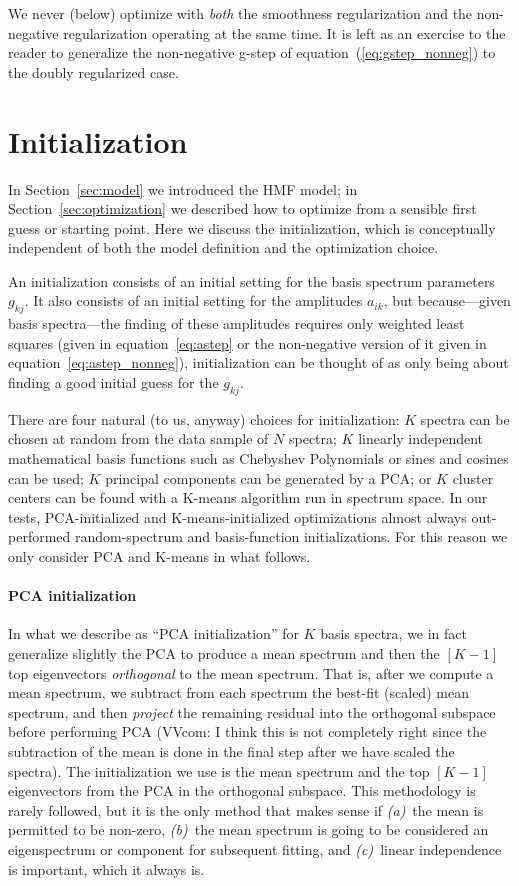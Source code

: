 \documentclass[12pt,preprint]{aastex}
\newcommand{\sectionname}{Section}
\newcommand{\equationname}{equation}
\begin{document}
We never (below) optimize with \emph{both} the smoothness
regularization and the non-negative regularization operating at the
same time.  It is left as an exercise to the reader to generalize the
non-negative g-step of \equationname~(\ref{eq:gstep_nonneg}) to the
doubly regularized case.

\section{Initialization}\label{sec:initialization}

In \sectionname~\ref{sec:model} we introduced the HMF model; in
\sectionname~\ref{sec:optimization} we described how to optimize from
a sensible first guess or starting point.  Here we discuss the
initialization, which is conceptually independent of both the model
definition and the optimization choice.

An initialization consists of an initial setting for the basis
spectrum parameters $g_{kj}$.  It also consists of an initial setting
for the amplitudes $a_{ik}$, but because---given basis spectra---the
finding of these amplitudes requires only weighted least squares
(given in \equationname~\ref{eq:astep} or the non-negative version of
it given in \equationname~\ref{eq:astep_nonneg}), initialization can
be thought of as only being about finding a good initial guess for the
$g_{kj}$.

There are four natural (to us, anyway) choices for initialization: $K$
spectra can be chosen at random from the data sample of $N$ spectra;
$K$ linearly independent mathematical basis functions such as
Chebyshev Polynomials or sines and cosines can be used; $K$ principal
components can be generated by a PCA; or $K$ cluster centers can be
found with a K-means algorithm run in spectrum space.  In our tests,
PCA-initialized and K-means-initialized optimizations almost always
out-performed random-spectrum and basis-function initializations.  For
this reason we only consider PCA and K-means in what follows.

\paragraph{PCA initialization}
In what we describe as ``PCA initialization'' for $K$ basis spectra,
we in fact generalize slightly the PCA to produce a mean spectrum and
then the $[K-1]$ top eigenvectors \emph{orthogonal} to the mean
spectrum.  That is, after we compute a mean spectrum, we subtract from
each spectrum the best-fit (scaled) mean spectrum, and then
\emph{project} the remaining residual into the orthogonal subspace
before performing PCA (VVcom: I think this is not completely right 
since the subtraction of the mean is done in the final step after we 
have scaled the spectra).  The initialization we use is the mean spectrum
and the top $[K-1]$ eigenvectors from the PCA in the orthogonal
subspace.  This methodology is rarely followed, but it is the only
method that makes sense if \textsl{(a)}~the mean is permitted to be
non-zero, \textsl{(b)}~the mean spectrum is going to be considered an
eigenspectrum or component for subsequent fitting, and
\textsl{(c)}~linear independence is important, which it always is.
\end{document}
